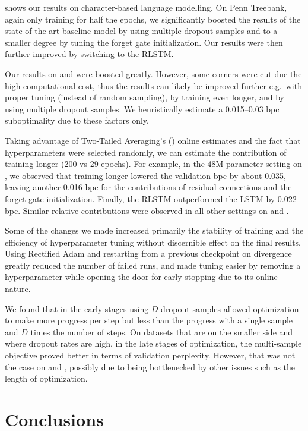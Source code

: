  shows our results on character-based language modelling.
On Penn Treebank, again only training for half the epochs, we significantly boosted the results of the state-of-the-art baseline model by using multiple dropout samples and to a smaller degree by tuning the forget gate initialization.
Our results were then further improved by switching to the RLSTM.

Our results on \enwik and \texteight were boosted greatly.
However, some corners were cut due the high computational cost, thus the results can likely be improved further e.g.\ with proper tuning (instead of random sampling), by training even longer, and by using multiple dropout samples.
We heuristically estimate a 0.015--0.03 bpc suboptimality due to these factors only.

Taking advantage of Two-Tailed Averaging's (\tta{}) online estimates and the fact that hyperparameters were selected randomly, we can estimate the contribution of training longer (200 vs 29 epochs).
For example, in the 48M parameter setting on \enwik, we observed that training longer lowered the validation bpc by about 0.035, leaving another 0.016 bpc for the contributions of residual connections and the forget gate initialization.
Finally, the RLSTM outperformed the LSTM by 0.022 bpc.
Similar relative contributions were observed in all other settings on \enwik and \texteight.

Some of the changes we made increased primarily the stability of training and the efficiency of hyperparameter tuning without discernible effect on the final results.
Using Rectified Adam and restarting from a previous checkpoint on divergence greatly reduced the number of failed runs, and \tta{} made tuning easier by removing a hyperparameter while opening the door for early stopping due to its online nature.

We found that in the early stages using $D$ dropout samples allowed optimization to make more progress per step but less than the progress with a single sample and $D$ times the number of steps.
On datasets that are on the smaller side and where dropout rates are high, in the late stages of optimization, the multi-sample objective proved better in terms of validation perplexity.
However, that was not the case on \enwik and \texteight, possibly due to being bottlenecked by other issues such as the length of optimization.

\section{Conclusions}

